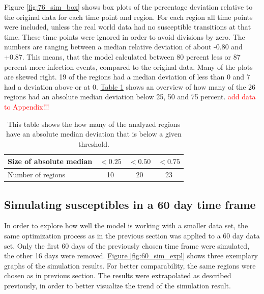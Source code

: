 Figure \ref*{fig:76_sim_box} shows box plots of the percentage deviation relative to the original data for each time point and region.
For each region all time points were included, unless the real world data had no susceptible transitions at that time. These
time points were ignored in order to avoid divisions by zero.
The numbers are ranging between a median relative deviation of about -0.80 and +0.87. This means, that the model calculated
between 80 percent less or 87 percent more infection events, compared to the original data. Many of the plots are skewed right.
19 of the regions had a median deviation of less than 0 and 7 had a deviation above or at 0.
\hyperref[tab:76d_regions]{Table \ref*{tab:76d_regions}} shows an overview of how many of the 26 regions had an absolute
median deviation below 25, 50 and 75 percent.
\textcolor{red}{add data to Appendix!!!}

\begin{table}[h]
	\centering
	\caption{This table shows the how many of the analyzed regions have an absolute median deviation that is below a given threshold.}
	\begin{tabular}{|l||c|c|c|}
		\hline
		Size of absolute median & $< 0.25$ & $< 0.50$ & $< 0.75$ \\ \hline
		Number of regions & 10 & 20 & 23 \\ \hline
	\end{tabular}
	\label{tab:76d_regions}
\end{table}




\subsection{Simulating susceptibles in a 60 day time frame}
In order to explore how well the model is working with a smaller data set, the same optimization process as in the previous section was
applied to a 60 day data set. Only the first 60 days of the previously chosen time frame were simulated, the other 16 days were
removed. \hyperref[fig:60_sim_expl]{Figure \ref*{fig:60_sim_expl}} shows three exemplary graphs of the simulation results.
For better comparability, the same regions were chosen as in previous section. The results were extrapolated as described previously,
in order to better visualize the trend of the simulation result.\newline

